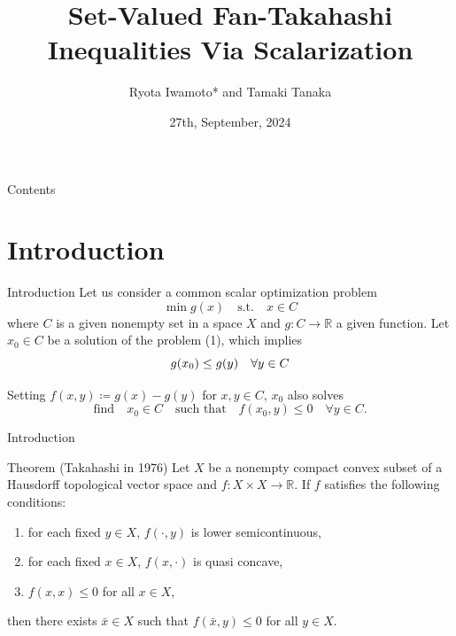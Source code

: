 \documentclass[aspectratio=169, dvipdfmx, 11pt]{beamer}
\title{Set-Valued Fan-Takahashi Inequalities Via Scalarization
}
\author[Ryota Iwamoto]{Ryota Iwamoto* and Tamaki Tanaka}
\institute[Niigata Univ]{Niigata Univ}
\date{27th, September, 2024}
\newcommand{\RealNumberSet}{\mathbb{R}}
\begin{document}
\maketitle






\begin{frame}{Contents}
  \tableofcontents
\end{frame}

\section{Introduction}

\begin{frame}{Introduction}
  Let us consider a common scalar optimization problem
  \begin{equation}
    \min g(x) \quad \text{s.t.} \quad x \in C
  \end{equation}
  where $C$ is a given nonempty set in a space $X$ and $g \colon C \to \RealNumberSet$ a given function.
  Let $x_0 \in C$ be a solution of the problem (1), which implies
  \begin{equation}
    g(x_0) \leq g(y) \quad \forall y \in C \notag
  \end{equation}

  Setting $f(x,y) \coloneqq g(x) - g(y)$ for $x,y \in C$, $x_0$ also solves
  \begin{equation}
    \text{find} \quad x_0 \in C \quad \text{such that} \quad f(x_0,y) \leq 0 \quad \forall y \in C.
  \end{equation}
\end{frame}

\begin{frame}{Introduction}
  \begin{block}{Theorem (Takahashi \cite{MR399979} in 1976)} %
    Let $X$ be a nonempty compact convex subset of a Hausdorff topological vector space and $f \colon X \times X \to \RealNumberSet$. If $f$ satisfies
    the following conditions:
    \begin{enumerate}
      \item for each fixed $y \in X$, $f(\cdot,y)$ is lower semicontinuous,
      \item for each fixed $x \in X$, $f(x,\cdot)$ is quasi concave,
      \item $f(x,x) \leq 0$ for all $x \in X$,
    \end{enumerate}
    then there exists $\bar{x} \in X$ such that $f(\bar{x},y) \leq 0$ for all $y \in X$.
  \end{block}
\end{frame}
\end{document}
